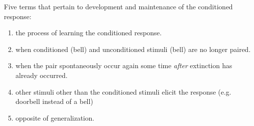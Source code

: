 \documentclass[../Psych_Soci_review.tex]{subfiles}
\begin{document}
Five terms that pertain to development and maintenance of the conditioned
response:
\begin{enumerate}
  \item {} the process of learning the conditioned response.
  \item {} when conditioned (bell) and unconditioned stimuli
    (bell) are no longer paired.
  \item {} when the pair spontaneously occur again
    some time \textit{after} extinction has already occurred.
  \item {} other stimuli other than the conditioned
    stimuli elicit the response (e.g. doorbell instead of a bell)
  \item {} opposite of generalization.
\end{enumerate}
\end{document}
